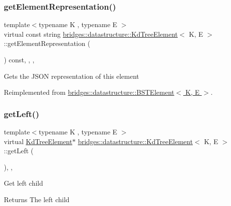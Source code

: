 \subsubsection{\texorpdfstring{get\+Element\+Representation()}{getElementRepresentation()}}
{\footnotesize\ttfamily template$<$typename K , typename E $>$ \\
virtual const string \hyperlink{classbridges_1_1datastructure_1_1_kd_tree_element}{bridges\+::datastructure\+::\+Kd\+Tree\+Element}$<$ K, E $>$\+::get\+Element\+Representation (\begin{DoxyParamCaption}{ }\end{DoxyParamCaption}) const\hspace{0.3cm}{\ttfamily [inline]}, {\ttfamily [override]}, {\ttfamily [protected]}, {\ttfamily [virtual]}}

Gets the J\+S\+ON representation of this element 

Reimplemented from \hyperlink{classbridges_1_1datastructure_1_1_b_s_t_element_a8f962a01b6e0eff59abeee7768264fd9}{bridges\+::datastructure\+::\+B\+S\+T\+Element$<$ K, E $>$}.

\mbox{\label{classbridges_1_1datastructure_1_1_kd_tree_element_a875bfa2dfd88a7740f7bcd28a117c12a}} 
\subsubsection{\texorpdfstring{get\+Left()}{getLeft()}\hspace{0.1cm}{\footnotesize\ttfamily [1/2]}}
{\footnotesize\ttfamily template$<$typename K , typename E $>$ \\
virtual \hyperlink{classbridges_1_1datastructure_1_1_kd_tree_element}{Kd\+Tree\+Element}$\ast$ \hyperlink{classbridges_1_1datastructure_1_1_kd_tree_element}{bridges\+::datastructure\+::\+Kd\+Tree\+Element}$<$ K, E $>$\+::get\+Left (\begin{DoxyParamCaption}{ }\end{DoxyParamCaption})\hspace{0.3cm}{\ttfamily [inline]}, {\ttfamily [override]}, {\ttfamily [virtual]}}

Get left child \begin{DoxyReturn}{Returns}
The left child 
\end{DoxyReturn}


